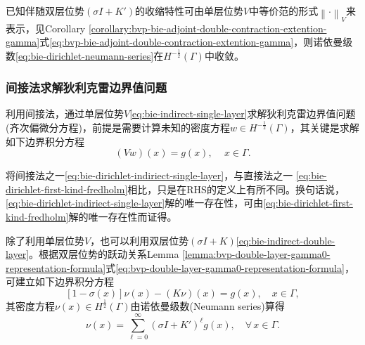 已知伴随双层位势$\left( \sigma I + K' \right)$的收缩特性可由单层位势$V$中等价范的形式$\left\| \cdot \right\|_{V}$来表示，见Corollary \ref{corollary:bvp-bie-adjoint-double-contraction-extention-gamma}式\eqref{eq:bvp-bie-adjoint-double-contraction-extention-gamma}，则诺依曼级数\eqref{eq:bie-dirichlet-neumann-series}在$H^{-\frac{1}{2}}(\Gamma)$中收敛。



\subsubsection{间接法求解狄利克雷边界值问题}
\label{sec:bie-dirichlet-indirect-approach}
利用间接法，通过单层位势$V$\eqref{eq:bie-indirect-single-layer}求解狄利克雷边界值问题(齐次偏微分方程)，前提是需要计算未知的密度方程$w \in H^{-\frac{1}{2}}(\Gamma)$，其关键是求解如下边界积分方程
\begin{equation}
  \label{eq:bie-dirichlet-indiriect-single-layer}
  \left(V w \right)(x) = g(x), \quad \, x \in \Gamma.
\end{equation}

将间接法之一\eqref{eq:bie-dirichlet-indiriect-single-layer}，与直接法之一
\eqref{eq:bie-dirichlet-first-kind-fredholm}相比，只是在RHS的定义上有所不同。换句话说，\eqref{eq:bie-dirichlet-indiriect-single-layer}解的唯一存在性，可由\eqref{eq:bie-dirichlet-first-kind-fredholm}解的唯一存在性而证得。

除了利用单层位势$V$，也可以利用双层位势$\left( \sigma I + K \right)$\eqref{eq:bie-indirect-double-layer}。根据双层位势的跃动关系Lemma \ref{lemma:bvp-double-layer-gamma0-representation-formula}式\eqref{eq:bvp-double-layer-gamma0-representation-formula}，可建立如下边界积分方程
\begin{equation}
  \label{eq:bie-dirichlet-indirect-double-layer}
  \left[ 1 - \sigma(x) \right] \nu(x)
  - \left( K \nu \right)(x) = g(x), \quad x \in \Gamma,
\end{equation}
其密度方程$\nu(x) \in H^{\frac{1}{2}}(\Gamma)$由诺依曼级数(Neumann series)算得
\begin{equation}
  \label{eq:bie-indirect-double-neumann-series}
  \nu(x) = \sum_{\ell = 0}^{\infty}
  \left( \sigma I + K' \right)^{\ell} g(x), \quad \forall \, x \in \Gamma.
\end{equation}

